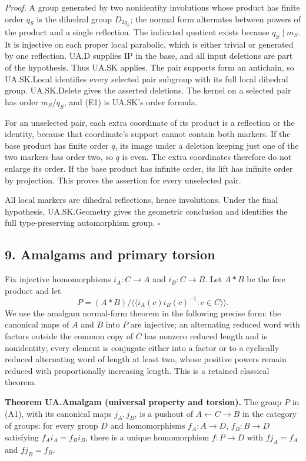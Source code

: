 \documentclass[
  11pt,
  a4paper,
]{article}
\begin{document}
\emph{Proof.} A group generated by two nonidentity involutions whose
product has finite order \(q_S\) is the dihedral group \(D_{2q_S}\); the
normal form alternates between powers of the product and a single
reflection. The indicated quotient exists because \(q_S\mid m_S\). It is
injective on each proper local parabolic, which is either trivial or
generated by one reflection. UA.D supplies IP in the base, and all input
deletions are part of the hypothesis. Thus UA.SK applies. The pair
supports form an antichain, so UA.SK.Local identifies every selected
pair subgroup with its full local dihedral group. UA.SK.Delete gives the
asserted deletions. The kernel on a selected pair has order \(m_S/q_S\),
and (E1) is UA.SK's order formula.

For an unselected pair, each extra coordinate of its product is a
reflection or the identity, because that coordinate's support cannot
contain both markers. If the base product has finite order \(q\), its
image under a deletion keeping just one of the two markers has order
two, so \(q\) is even. The extra coordinates therefore do not enlarge
its order. If the base product has infinite order, its lift has infinite
order by projection. This proves the assertion for every unselected
pair.

All local markers are dihedral reflections, hence involutions. Under the
final hypothesis, UA.SK.Geometry gives the geometric conclusion and
identifies the full type-preserving automorphism group. \(\square\)

\subsection{9. Amalgams and primary
torsion}\label{amalgams-and-primary-torsion}

Fix injective homomorphisms \(i_A:C\to A\) and \(i_B:C\to B\). Let
\(A*B\) be the free product and let \[
P=(A*B)/\langle\!\langle i_A(c)i_B(c)^{-1}:c\in C\rangle\!\rangle.
\tag{A1}
\] We use the amalgam normal-form theorem in the following precise form:
the canonical maps of \(A\) and \(B\) into \(P\) are injective; an
alternating reduced word with factors outside the common copy of \(C\)
has nonzero reduced length and is nonidentity; every element is
conjugate either into a factor or to a cyclically reduced alternating
word of length at least two, whose positive powers remain reduced with
proportionally increasing length. This is a retained classical theorem.

\textbf{Theorem UA.Amalgam (universal property and torsion).} The group
\(P\) in (A1), with its canonical maps \(j_A,j_B\), is a pushout of
\(A\leftarrow C\to B\) in the category of groups: for every group \(D\)
and homomorphisms \(f_A:A\to D\), \(f_B:B\to D\) satisfying
\(f_Ai_A=f_Bi_B\), there is a unique homomorphism \(f:P\to D\) with
\(fj_A=f_A\) and \(fj_B=f_B\).
\end{document}
